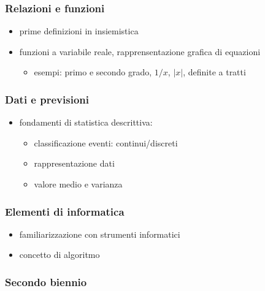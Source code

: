 \documentclass[letterpaper,10pt,italian]{jupyterBook}
\begin{document}
\subsubsection*{Relazioni e funzioni}
\begin{itemize}
\item {} 
\sphinxAtStartPar
prime definizioni in insiemistica

\item {} 
\sphinxAtStartPar
funzioni a variabile reale, rapprensentazione grafica di equazioni
\begin{itemize}
\item {} 
\sphinxAtStartPar
esempi: primo e secondo grado, \(1/x\), \(|x|\), definite a tratti

\end{itemize}

\end{itemize}
\subsubsection*{Dati e previsioni}
\begin{itemize}
\item {} 
\sphinxAtStartPar
fondamenti di statistica descrittiva:
\begin{itemize}
\item {} 
\sphinxAtStartPar
classificazione eventi: continui/discreti

\item {} 
\sphinxAtStartPar
rappresentazione dati

\item {} 
\sphinxAtStartPar
valore medio e varianza

\end{itemize}

\end{itemize}
\subsubsection*{Elementi di informatica}
\begin{itemize}
\item {} 
\sphinxAtStartPar
familiarizzazione con strumenti informatici

\item {} 
\sphinxAtStartPar
concetto di algoritmo

\end{itemize}
\subsubsection*{Secondo biennio}
\end{document}
